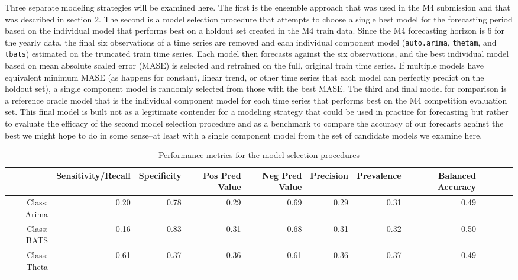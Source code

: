 \documentclass[11pt,3p,review,authoryear]{elsarticle}
\begin{document}
Three separate modeling strategies will be examined here. The first is the ensemble approach that was used in the M4 submission and that was described in section 2. The second is a model selection procedure that attempts to choose a single best model for the forecasting period based on the individual model that performs best on a holdout set created in the M4 train data. Since the M4 forecasting horizon is 6 for the yearly data, the final six observations of a time series are removed and each individual component model (\texttt{auto.arima}, \texttt{thetam}, and \texttt{tbats}) estimated on the truncated train time series. Each model then forecasts against the six observations, and the best individual model based on mean absolute scaled error (MASE) is selected and retrained on the full, original train time series. If multiple models have equivalent minimum MASE (as happens for constant, linear trend, or other time series that each model can perfectly predict on the holdout set), a single component model is randomly selected from those with the best MASE. The third and final model for comparison is a reference oracle model that is the individual component model for each time series that performs best on the M4 competition evaluation set. This final model is built not as a legitimate contender for a modeling strategy that could be used in practice for forecasting but rather to evaluate the efficacy of the second model selection procedure and as a benchmark to compare the accuracy of our forecasts against the best we might hope to do in some sense--at least with a single component model from the set of candidate models we examine here.

\begin{table}[ht]
\centering
\begin{adjustbox}{width=1\textwidth}
\begin{tabular}{rrrrrrrrrrrr}
  \hline
 & Sensitivity/Recall & Specificity & Pos Pred Value & Neg Pred Value & Precision & Prevalence &  Balanced Accuracy \\ 
  \hline
Class: Arima & 0.20 & 0.78 & 0.29 & 0.69 & 0.29 & 0.31 & 0.49 \\ 
  Class: BATS & 0.16 & 0.83 & 0.31 & 0.68 & 0.31 & 0.32 & 0.50 \\ 
  Class: Theta & 0.61 & 0.37 & 0.36 & 0.61 & 0.36 & 0.37 & 0.49 \\ 
   \hline
\end{tabular}
\end{adjustbox}
\caption{Performance metrics for the model selection procedures}\label{tab:a}
\end{table}
\end{document}
